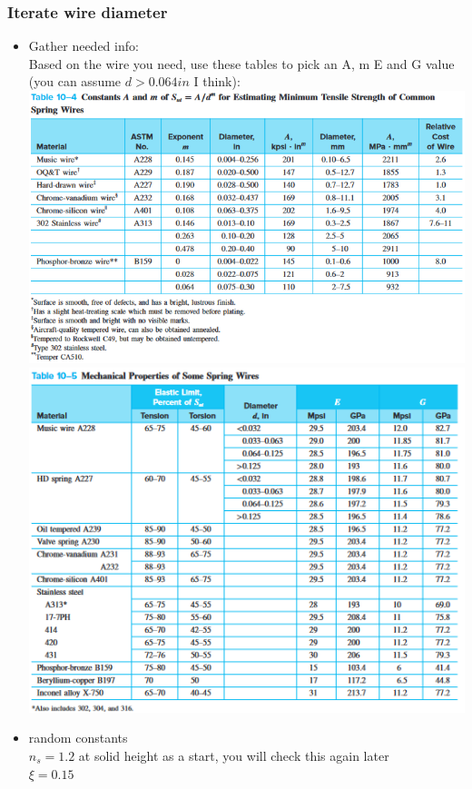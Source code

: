\documentclass[11pt, fleqn]{article}
\begin{document}
\subsubsection{Iterate wire diameter}
\begin{itemize}
    \item Gather needed info:\\
    Based on the wire you need, use these tables to pick an A, m E and G value (you can assume $d >0.064in$ I think):\\
    \includegraphics[scale=0.7]{Springs/Tab10-4.png}\\
    \includegraphics[scale = 0.9]{Springs/Tab10-5.png}\\

    \item random constants\\
    $n_s = 1.2$ at solid height as a start, you will check this again later\\
    $\xi = 0.15$\\


\end{itemize}
\end{document}
